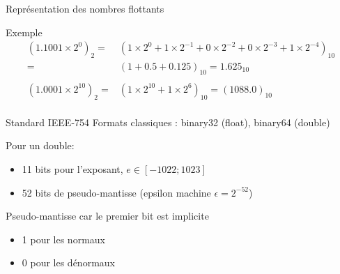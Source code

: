\documentclass{beamer}
\begin{document}
\begin{frame}{Représentation des nombres flottants}
\begin{center}
    \end{center}
    \begin{block}{Exemple}
        \begin{align*}
            (1.1001 \times 2^0)_2 =    & (1 \times 2^0 + 1 \times 2^{-1} + 0 \times 2^{-2} + 0 \times 2^{-3} + 1 \times 2^{-4} )_{10} \\
            =                          & (1 + 0.5 + 0.125)_{10} = 1.625_{10}                                                          \\                                                \\
            (1.0001 \times 2^{10})_2 = & (1 \times 2^{10} + 1 \times 2^6)_{10} = (1088.0)_{10}                                        \\
        \end{align*}
    \end{block}
\end{frame}

\begin{frame}{Standard IEEE-754}
    Formats classiques : binary32 (float), binary64 (double)

    Pour un double:
    \begin{itemize}
        \item 11 bits pour l'exposant, $e \in [-1022; 1023]$
        \item 52 bits de pseudo-mantisse (epsilon machine $\epsilon = 2^{-52}$)
    \end{itemize}

    Pseudo-mantisse car le premier bit est implicite
    \begin{itemize}
        \item 1 pour les normaux
        \item 0 pour les dénormaux
    \end{itemize}
\end{frame}
\end{document}
